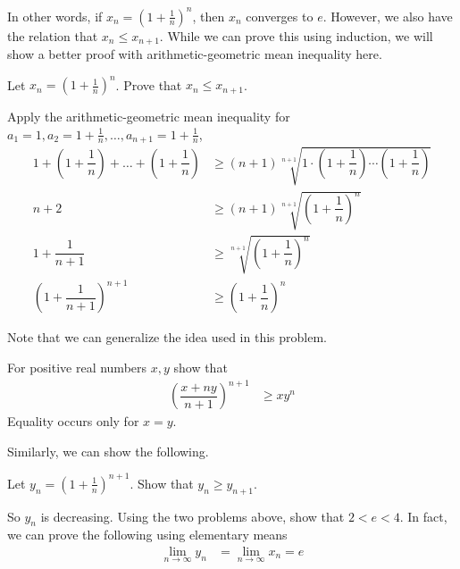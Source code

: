 \documentclass{subfile}
\begin{document}
	In other words, if $x_n=\left(1+\frac{1}{n}\right)^n$, then $x_n$ converges to $e$. However, we also have the relation that $x_n\leq x_{n+1}$. While we can prove this using induction, we will show a better proof with arithmetic-geometric mean inequality here.
		\begin{problem}
			Let $x_n=\left(1+\frac{1}{n}\right)^n$. Prove that $x_n\leq x_{n+1}$.
				\begin{solution}
					Apply the arithmetic-geometric mean inequality for $a_1=1,a_2=1+\frac{1}{n},\ldots,a_{n+1}=1+\frac{1}{n}$,
						\begin{align*}
							1+\left(1+\dfrac{1}{n}\right)+\ldots+\left(1+\dfrac{1}{n}\right)
								& \geq(n+1)\sqrt[n+1]{1\cdot\left(1+\dfrac{1}{n}\right)\cdots\left(1+\dfrac{1}{n}\right)}\\
							n+2
								& \geq(n+1)\sqrt[n+1]{\left(1+\dfrac{1}{n}\right)^n}\\
							1+\dfrac{1}{n+1}
								& \geq\sqrt[n+1]{\left(1+\dfrac{1}{n}\right)^n}\\
							\left(1+\dfrac{1}{n+1}\right)^{n+1}
								& \geq\left(1+\dfrac{1}{n}\right)^n
						\end{align*}
				\end{solution}
		\end{problem}
	Note that we can generalize the idea used in this problem.
		\begin{problem}
			For positive real numbers $x,y$ show that
				\begin{align*}
					\left(\dfrac{x+ny}{n+1}\right)^{n+1}
						& \geq xy^n
				\end{align*}
			Equality occurs only for $x=y$.
		\end{problem}
	Similarly, we can show the following.
		\begin{problem}
			Let $y_n=\left(1+\frac{1}{n}\right)^{n+1}$. Show that $y_n\geq y_{n+1}$.
		\end{problem}
	So $y_n$ is decreasing. Using the two problems above, show that $2<e<4$. In fact, we can prove the following using elementary means
		\begin{align*}
			\lim\limits_{n\to\infty}y_{n}
				& = \lim\limits_{n\to\infty}x_{n}=e
		\end{align*}
\end{document}
